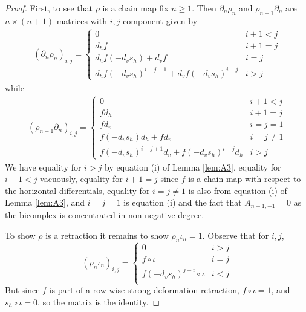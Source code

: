\begin{proof}
    First, to see that $\rho$ is a chain map fix $n \geq 1$. Then $\partial_n\rho_n$ and $\rho_{n-1}\partial_n$ are $n\times (n+1)$ matrices with $i,j$ component given by 
    \begin{align*}
        (\partial_n\rho_n)_{i,j} = \left\{\begin{array}{cc} 
            0 & i+1 < j \\
            d_hf & i+1 = j \\
            d_hf(-d_vs_h)+d_vf & i = j \\
            d_hf(-d_vs_h)^{i-j+1}+d_vf(-d_vs_h)^{i-j} & i > j 
        \end{array}\right.
    \end{align*} 
    while
    \begin{align*}
        (\rho_{n-1}\partial_n)_{i,j} = \left\{\begin{array}{cc} 
            0 & i+1 < j \\
            fd_h & i+1 = j \\ 
            fd_v & i = j = 1 \\
            f(-d_vs_h)d_h+fd_v & i = j \neq 1 \\
            f(-d_vs_h)^{i-j+1}d_v+f(-d_vs_h)^{i-j}d_h & i > j 
        \end{array}\right.
    \end{align*}
    We have equality for $i > j$ by equation (i) of Lemma \ref{lem:A3}, equality for $i+1 < j$ vacuously, equality for $i+1 = j$ since $f$ is a chain map with respect to the horizontal differentials, equality for $i = j \neq 1$ is also from equation (i) of Lemma \ref*{lem:A3}, and $i = j = 1$ is equation (i) and the fact that $A_{n+1,-1} = 0$ as the bicomplex is concentrated in non-negative degree.

    \vspace{10pt}

    To show $\rho$ is a retraction it remains to show $\rho_n\iota_n = 1$. Observe that for $i,j$,
    \begin{equation*}
        (\rho_n\iota_n)_{i,j} = \left\{\begin{array}{cc} 
            0 & i > j \\
            f\circ \iota & i = j \\
            f(-d_vs_h)^{j-i}\circ \iota & i < j \\
        \end{array}\right.
    \end{equation*}
    But since $f$ is part of a row-wise strong deformation retraction, $f\circ \iota = 1$, and $s_h \circ \iota = 0$, so the matrix is the identity.
\end{proof}


